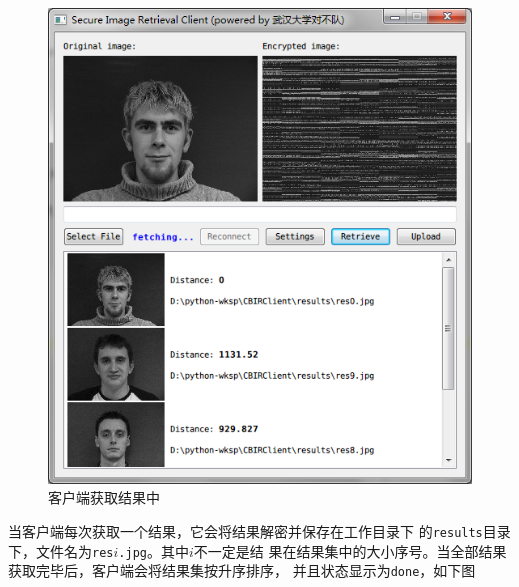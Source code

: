 \begin{figure}[H]
  \centering
  \includegraphics[keepaspectratio=true]{images/ui-retrieve-fetching.png}
  \caption{客户端获取结果中}
  \label{fig:ui-retrieve-fetching}
\end{figure}

当客户端每次获取一个结果，它会将结果解密并保存在工作目录下
的\texttt{results}目录下，文件名为\texttt{res$i$.jpg}。其中$i$不一定是结
果在结果集中的大小序号。当全部结果获取完毕后，客户端会将结果集按升序排序，
并且状态显示为\texttt{done}，如下图

